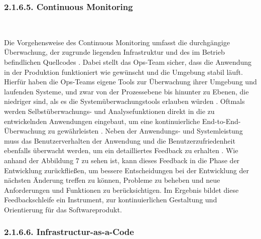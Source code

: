 \subsubsection{2.1.6.5. Continuous Monitoring} $~$

Die Vorgehensweise des Continuous Monitoring umfasst die durchgängige Überwachung, der zugrunde liegenden Infrastruktur und des im Betrieb befindlichen Quellcodes \cite{van_hoorn_continuous_2012}. Dabei stellt das Ops-Team sicher, dass die Anwendung in der Produktion funktioniert wie gewünscht und die Umgebung stabil läuft. Hierfür haben die Ops-Teams eigene Tools zur Überwachung ihrer Umgebung und laufenden Systeme, und zwar von der Prozessebene bis hinunter zu Ebenen, die niedriger sind, als es die Systemüberwachungstools erlauben würden \cite[S. 26]{sharma_devops_2017}. Oftmals werden Selbstüberwachungs- und Analysefunktionen direkt in die zu entwickelnden Anwendungen eingebaut, um eine kontinuierliche End-to-End-Überwachung zu gewährleisten \cite[S. 26]{sharma_devops_2017}. Neben der Anwendungs- und Systemleistung muss das Benutzerverhalten der Anwendung und die Benutzerzufriedenheit ebenfalls überwacht werden, um ein detailliertes Feedback zu erhalten \cite[S. 112 - 113]{erder_continuous_2016}. Wie anhand der Abbildung 7 zu sehen ist, kann dieses Feedback in die Phase der Entwicklung zurückfließen, um bessere Entscheidungen bei der Entwicklung der nächsten Änderung treffen zu können, Probleme zu beheben und neue Anforderungen und Funktionen zu berücksichtigen. Im Ergebnis bildet diese Feedbackschleife ein Instrument, zur kontinuierlichen Gestaltung und Orientierung für das Softwareprodukt.   

\subsubsection{2.1.6.6. Infrastructur-as-a-Code} $~$

